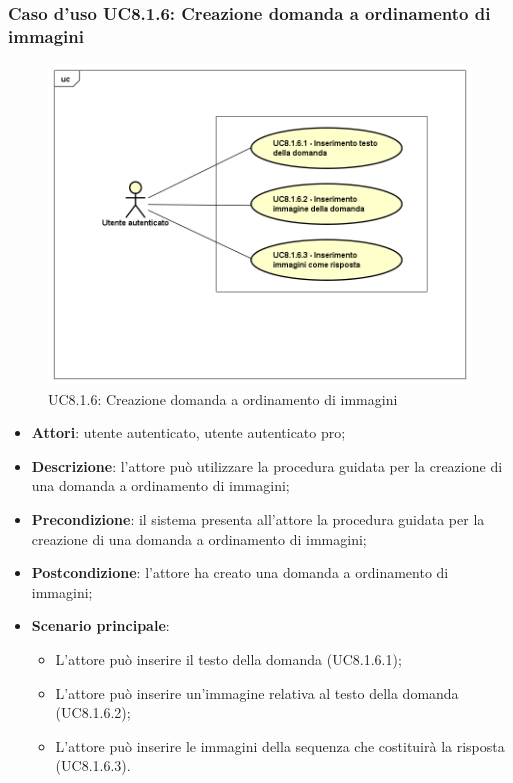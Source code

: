 \subsubsection{Caso d'uso UC8.1.6: Creazione domanda a ordinamento di immagini}
\label{UC8.1.6}
	\begin{figure}[h]
		\centering
			\includegraphics[scale=0.45,keepaspectratio]{UML/UC8_1_6.png}
		\caption{UC8.1.6: Creazione domanda a ordinamento di immagini}
	\end{figure}
	\FloatBarrier
\begin{itemize}
	\item\textbf{Attori}: utente autenticato, utente autenticato pro;
	\item\textbf{Descrizione}: l'attore può utilizzare la procedura guidata per la creazione di una domanda a ordinamento di immagini;
	\item\textbf{Precondizione}: il sistema presenta all'attore la procedura guidata per la creazione di una domanda a ordinamento di immagini; 
	\item \textbf{Postcondizione}: l'attore ha creato una domanda a ordinamento di immagini;
	\item\textbf{Scenario principale}:
	\begin{itemize}
		\item L'attore può inserire il testo della domanda (UC8.1.6.1);
		\item L'attore può inserire un'immagine relativa al testo della domanda (UC8.1.6.2);
		\item L'attore può inserire le immagini della sequenza che costituirà la risposta (UC8.1.6.3).
	\end{itemize}
\end{itemize}

